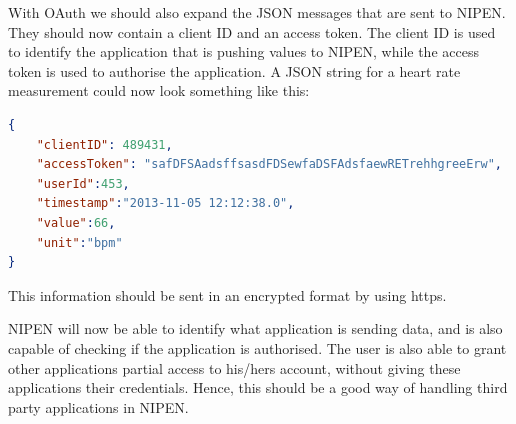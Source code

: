With OAuth we should also expand the JSON messages that are sent to NIPEN.
They should now contain a client ID and an access token.
The client ID is used to identify the application that is pushing values to NIPEN, while the access token is used to authorise the application.
A JSON string for a heart rate measurement could now look something like this:

\begin{lstlisting}[language=json]
{
	"clientID": 489431,
	"accessToken": "safDFSAadsffsasdFDSewfaDSFAdsfaewRETrehhgreeErw",
	"userId":453,
	"timestamp":"2013-11-05 12:12:38.0",
	"value":66,
	"unit":"bpm"
}
\end{lstlisting}

This information should be sent in an encrypted format by using https.

NIPEN will now be able to identify what application is sending data, and is also capable of checking if the application is authorised.
The user is also able to grant other applications partial access to his/hers account, without giving these applications their credentials.
Hence, this should be a good way of handling third party applications in NIPEN.

\fi